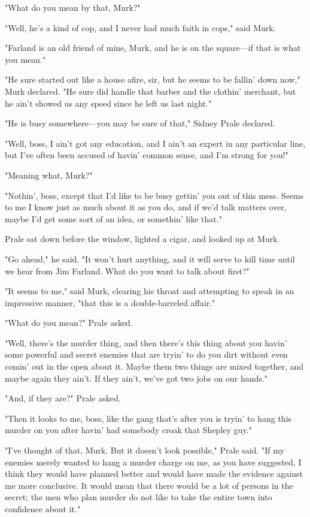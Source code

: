 \documentclass{novel}
\begin{document}
"What do you mean by that, Murk?"

"Well, he's a kind of cop, and I never had much faith in cops," said Murk.

"Farland is an old friend of mine, Murk, and he is on the square---if that is what you mean."

"He sure started out like a house afire, sir, but he seems to be fallin' down now," Murk declared. "He sure did handle that barber and the clothin' merchant, but he ain't showed us any speed since he left us last night."

"He is busy somewhere---you may be sure of that," Sidney Prale declared.

"Well, boss, I ain't got any education, and I ain't an expert in any particular line, but I've often been accused of havin' common sense, and I'm strong for you!"

"Meaning what, Murk?"

"Nothin', boss, except that I'd like to be busy gettin' you out of this mess. Seems to me I know just as much about it as you do, and if we'd talk matters over, maybe I'd get some sort of an idea, or somethin' like that."

Prale sat down before the window, lighted a cigar, and looked up at Murk.

"Go ahead," he said. "It won't hurt anything, and it will serve to kill time until we hear from Jim Farland. What do you want to talk about first?"

"It seems to me," said Murk, clearing his throat and attempting to speak in an impressive manner, "that this is a double-barreled affair."

"What do you mean?" Prale asked.

"Well, there's the murder thing, and then there's this thing about you havin' some powerful and secret enemies that are tryin' to do you dirt without even comin' out in the open about it. Maybe them two things are mixed together, and maybe again they ain't. If they ain't, we've got two jobs on our hands."

"And, if they are?" Prale asked.

"Then it looks to me, boss, like the gang that's after you is tryin' to hang this murder on you after havin' had somebody croak that Shepley guy."

"I've thought of that, Murk. But it doesn't look possible," Prale said. "If my enemies merely wanted to hang a murder charge on me, as you have suggested, I think they would have planned better and would have made the evidence against me more conclusive. It would mean that there would be a lot of persons in the secret; the men who plan murder do not like to take the entire town into confidence about it."
\end{document}

